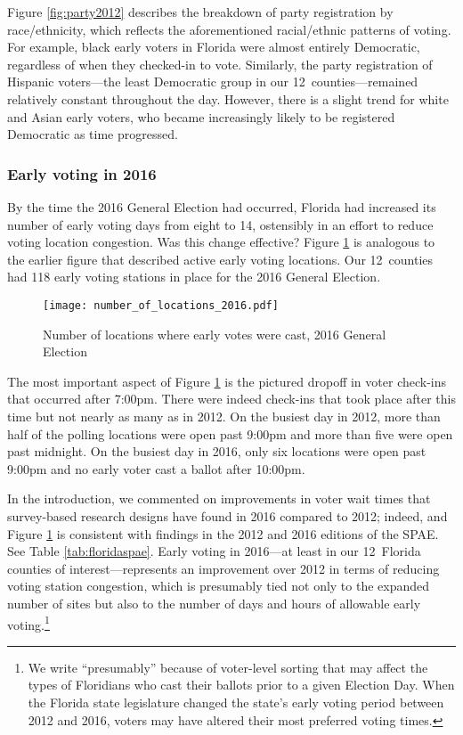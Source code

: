 \documentclass[12pt,titlepage]{article}
\newcommand{\numcounties}{12}
\begin{document}
Figure \ref{fig:party2012} describes the breakdown of party
registration by race/ethnicity, which reflects the aforementioned
racial/ethnic patterns of voting.  For example, black early voters in
Florida were almost entirely Democratic, regardless of when they
checked-in to vote.  Similarly, the party registration of Hispanic
voters---the least Democratic group in our \numcounties\
counties---remained relatively constant throughout the day.
However, there is a slight trend for white and Asian early voters, who
became increasingly likely to be registered Democratic as time
progressed.

\subsubsection*{Early voting in 2016}

By the time the 2016 General Election had occurred, Florida had
increased its number of early voting days from eight to 14, ostensibly
in an effort to reduce voting location congestion. Was this change
effective?  Figure \ref{fig:nrlocs2016} is analogous to the earlier
figure that described active early voting locations. Our \numcounties\
counties had 118 early voting stations in place for the 2016 General
Election.


\begin{figure}[!ht]
  \caption{Number of locations where early votes were cast, 2016 General
    Election}
  \label{fig:nrlocs2016}
  \centering
    \centering\texttt{[image: number\_of\_locations\_2016.pdf]}
\end{figure}

The most important aspect of Figure \ref{fig:nrlocs2016} is the
pictured dropoff in voter check-ins that occurred after 7:00pm. There
were indeed check-ins that took place after this time but not nearly
as many as in 2012. On the busiest day in 2012, more than half of the
polling locations were open past 9:00pm and more than five were open
past midnight. On the busiest day in 2016, only six locations were
open past 9:00pm and no early voter cast a ballot after 10:00pm.

In the introduction, we commented on improvements in voter wait times
that survey-based research designs have found in 2016 compared to
2012; indeed, and Figure \ref{fig:nrlocs2016} is consistent with
findings in the 2012 \citep{spae2012} and 2016 \citep{spae2016}
editions of the SPAE.  See Table \ref{tab:floridaspae}.  Early voting
in 2016---at least in our \numcounties\ Florida counties of
interest---represents an improvement over 2012 in terms of reducing
voting station congestion, which is presumably tied not only to the
expanded number of sites but also to the number of days and hours of
allowable early voting.\footnote{We write ``presumably'' because of
  voter-level sorting that may affect the types of Floridians who cast
  their ballots prior to a given Election Day.  When the Florida state
  legislature changed the state's early voting period between 2012 and
  2016, voters may have altered their most preferred voting times.}
\end{document}
